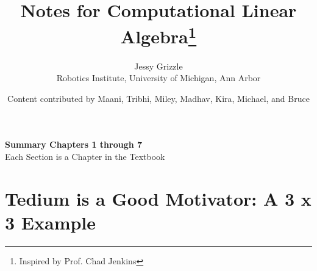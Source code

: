 \documentclass[letterpaper]{book}
\title{Notes for Computational Linear Algebra\thanks{Inspired by Prof. Chad Jenkins}}
\date{}
\author{Jessy Grizzle\\ Robotics Institute, University of Michigan, Ann Arbor
\and Content contributed by Maani, Tribhi, Miley, Madhav, Kira, Michael, and Bruce}
\begin{document}
\newtheorem{example}{Example}



\begin{center}
    {\bf \Large Summary Chapters 1 through 7} \\
    Each Section is a Chapter in the Textbook
\end{center}

\setcounter{chapter}{1}
\setcounter{section}{-1}
\section{Tedium is a Good Motivator: A 3 x 3 Example}
\end{document}
